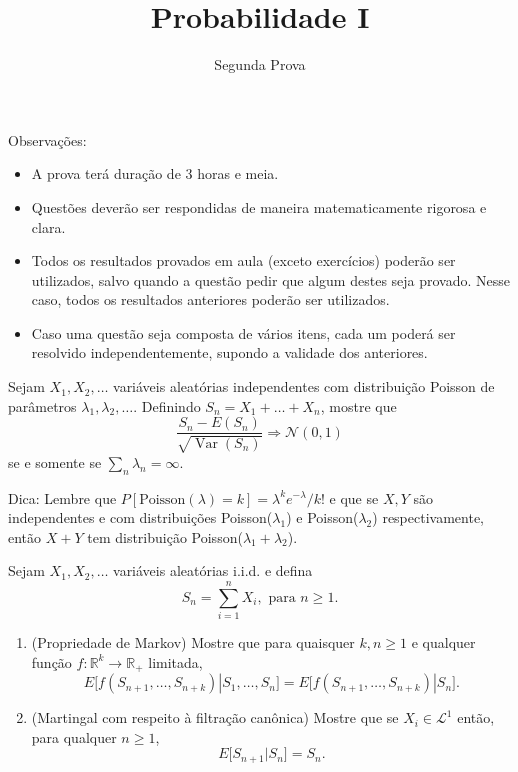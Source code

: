 \documentclass{article}
\newcommand*\1{\mathds{1}}
\DeclareMathOperator{\Var}{Var}
\begin{document}
\title{Probabilidade I}
\author{Segunda Prova}

\maketitle

\noindent Observa\c{c}\~oes:
\begin{itemize}
\item A prova terá duração de $3$ horas e meia.
\item Questões deverão ser respondidas de maneira matematicamente rigorosa e clara.
\item Todos os resultados provados em aula (exceto exercícios) poderão ser utilizados, salvo quando a questão pedir que algum destes seja provado. Nesse caso, todos os resultados anteriores poderão ser utilizados.
\item Caso uma questão seja composta de vários itens, cada um poderá ser resolvido independentemente, supondo a validade dos anteriores.
\end{itemize}

\vspace{4mm}
 Sejam $X_1, X_2, \dots$ variáveis aleatórias independentes com distribuição Poisson de parâmetros $\lambda_1, \lambda_2, \dots$.
Definindo $S_n = X_1 + \dots + X_n$, mostre que
\begin{equation}
  \frac{S_n - E(S_n)}{\sqrt{\Var(S_n)}} \Rightarrow \mathcal{N}(0, 1)
\end{equation}
se e somente se $\sum_n \lambda_n = \infty$.

\vspace{2mm}
\noindent
Dica: Lembre que $P[\text{Poisson}(\lambda) = k] = \lambda^k e^{-\lambda}/k!$ e que se $X, Y$ são independentes e com distribuições Poisson($\lambda_1$) e Poisson($\lambda_2$) respectivamente, então $X + Y$ tem distribuição Poisson($\lambda_1 + \lambda_2$).

\vspace{4mm}
 Sejam $X_1, X_2, \dots$ variáveis aleatórias i.i.d. e defina
\begin{equation}
  S_n = \sum_{i = 1}^n X_i, \text{ para $n \geq 1$}.
\end{equation}
\begin{enumerate}[\quad a)]
\item (Propriedade de Markov) Mostre que para quaisquer $k, n \geq 1$ e qualquer função $f: \mathbb{R}^k \to \mathbb{R}_+$ limitada,
  \begin{equation}
    E \big[ f(S_{n + 1}, \dots, S_{n + k}) | S_1, \dots, S_n \big]
    = E \big[ f(S_{n + 1}, \dots, S_{n + k}) | S_n \big].
  \end{equation}
\item (Martingal com respeito à filtração canônica) Mostre que se $X_i \in \mathcal{L}^1$ então, para qualquer $n \geq 1$,
  \begin{equation}
    E \big[ S_{n + 1} | S_n \big] = S_n.
  \end{equation}
\end{enumerate}
\end{document}
